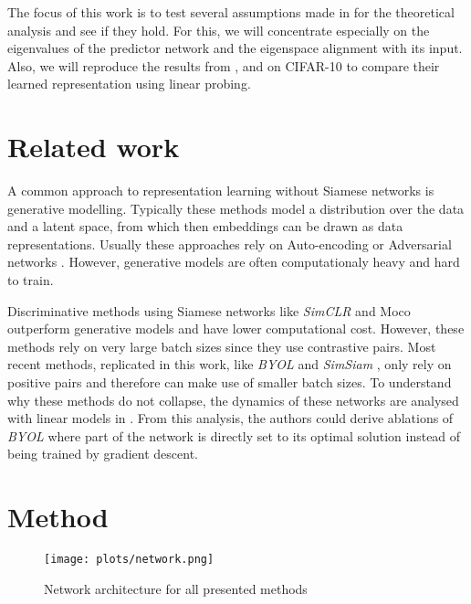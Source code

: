 The focus of this work is to test several assumptions made in \cite{tian2021understanding} for the theoretical analysis and see if they hold. For this, we will concentrate especially on the eigenvalues of the predictor network and the eigenspace alignment with its input. Also, we will reproduce the results from \cite{tian2021understanding}, \cite{grill2020bootstrap} and \cite{chen2020exploring} on CIFAR-10 to compare their learned representation using linear probing. 

\section{Related work}
\label{sec:rel_work}
A common approach to representation learning without Siamese networks is generative modelling. Typically these methods model a distribution over the data and a latent space, from which then embeddings can be drawn as data representations. Usually these approaches rely on Auto-encoding \cite{kingma2014autoencoding, vincent2008denoising} or Adversarial networks \cite{donahue2017adversarial, donahue2019large}. However, generative models are often computationaly heavy and hard to train.

Discriminative methods using Siamese networks like \emph{\emph{SimCLR}} \cite{chen2020simple, chen2020big} and Moco \cite{he2020momentum} outperform generative models and have lower computational cost. However, these methods rely on very large batch sizes since they use contrastive pairs. Most recent methods, replicated in this work, like \emph{BYOL} \cite{grill2020bootstrap} and \emph{SimSiam} \cite{chen2020exploring}, only rely on positive pairs and therefore can make use of smaller batch sizes. To understand why these methods do not collapse, the dynamics of these networks are analysed with linear models in \cite{tian2021understanding, wang2021demystifying}. From this analysis, the authors could derive ablations of \emph{BYOL} where part of the network is directly set to its optimal solution instead of being trained by gradient descent. 

\section{Method}
\begin{figure}[h]
    \centering
    \texttt{[image: plots/network.png]}
    \caption{Network architecture for all presented methods}
    \label{fig:network}
\end{figure}

